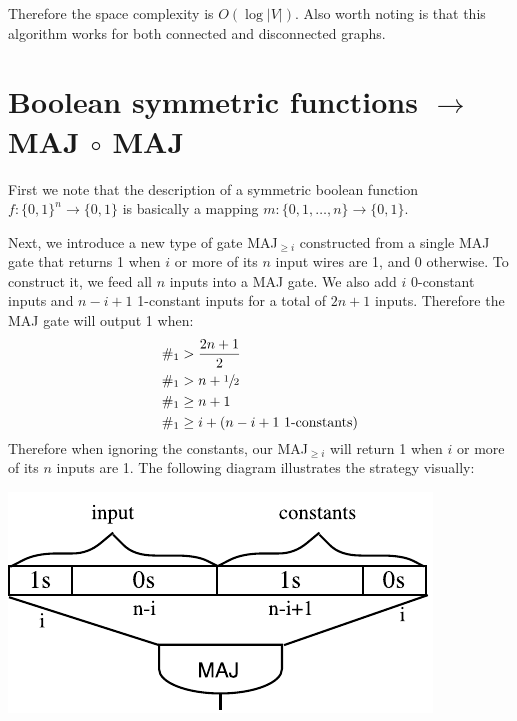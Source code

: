 \documentclass{article}
\begin{document}
Therefore the space complexity is $O(\log |V|)$.
Also worth noting is that this algorithm works for both connected and disconnected graphs.


\section{Boolean symmetric functions $\rightarrow$ MAJ $\circ$ MAJ}

First we note that the description of a symmetric boolean function $f:\{0,1\}^n\rightarrow \{0,1\}$ is basically a mapping $m:\{0,1,\dotsc,n\}\rightarrow \{0,1\}$.

Next, we introduce a new type of gate MAJ$_{\geq i}$ constructed from a single MAJ gate that returns 1 when $i$ or more of its $n$ input wires are 1, and 0 otherwise. To construct it, we feed all $n$ inputs into a MAJ gate. We also add $i$ 0-constant inputs and $n-i+1$ 1-constant inputs for a total of $2n+1$ inputs. Therefore the MAJ gate will output 1 when:
\begin{align*}
\#_1 &> \frac{2n+1}{2} \\
\#_1 &> n + \sfrac{1}{2} \\
\#_1 &\geq n + 1 \\
\#_1 &\geq i + (n-i+1 \text{ 1-constants})
\end{align*}
Therefore when ignoring the constants, our MAJ$_{\geq i}$ will return 1 when $i$ or more of its $n$ inputs are 1. The following diagram illustrates the strategy visually:

\includegraphics{q3_maj_geq.pdf}

\end{document}
